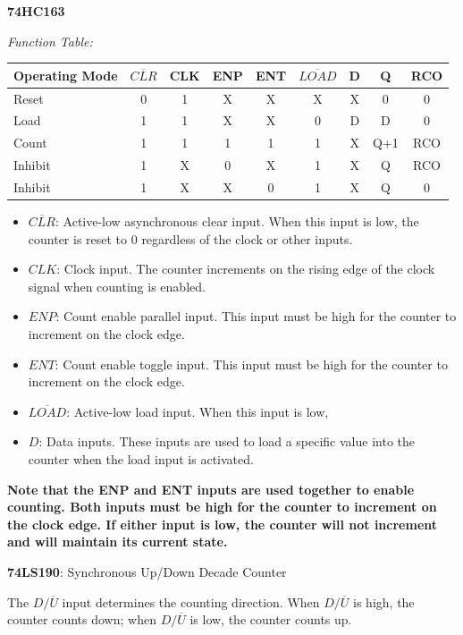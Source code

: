 \documentclass[11pt,a4paper]{article}
\providecommand{\tightlist}{\setlength{\itemsep}{1pt}\setlength{\parskip}{0pt}}
\begin{document}
\textbf{74HC163}

\emph{Function Table:}

\begin{center}
\small
\begin{tabular}{lcccccccc}
\toprule
Operating Mode & $\overline{CLR}$ & CLK & ENP & ENT & $\overline{LOAD}$ & D & Q & RCO \\
\midrule
Reset   & 0 & 1 & X & X & X & X & 0   & 0 \\
Load    & 1 & 1 & X & X & 0 & D & D   & 0 \\
Count   & 1 & 1 & 1 & 1 & 1 & X & Q+1 & RCO \\
Inhibit & 1 & X & 0 & X & 1 & X & Q   & RCO \\
Inhibit & 1 & X & X & 0 & 1 & X & Q   & 0 \\
\bottomrule
\end{tabular}
\end{center}

\begin{itemize}
\tightlist
\item
  \(\overline{CLR}\): Active-low asynchronous clear input. When this
  input is low, the counter is reset to 0 regardless of the clock or
  other inputs.
\item
  \(CLK\): Clock input. The counter increments on the rising edge of the
  clock signal when counting is enabled.
\item
  \(ENP\): Count enable parallel input. This input must be high for the
  counter to increment on the clock edge.
\item
  \(ENT\): Count enable toggle input. This input must be high for the
  counter to increment on the clock edge.
\item
  \(\overline{LOAD}\): Active-low load input. When this input is low,
\item
  \(D\): Data inputs. These inputs are used to load a specific value
  into the counter when the load input is activated.
\end{itemize}

\textbf{Note that the ENP and ENT inputs are used together to enable
counting. Both inputs must be high for the counter to increment on the
clock edge. If either input is low, the counter will not increment and
will maintain its current state.}

\textbf{74LS190}: Synchronous Up/Down Decade Counter

The \(D/\overline{U}\) input determines the counting direction. When
\(D/\overline{U}\) is high, the counter counts down; when
\(D/\overline{U}\) is low, the counter counts up.
\end{document}
